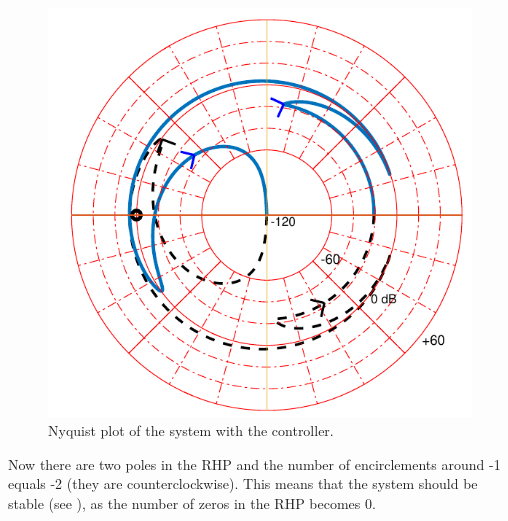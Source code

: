 \begin{figure}[H] 
	\centering 
	\includegraphics[scale=0.55]{figures/nyquistController}	
	\caption{Nyquist plot of the system with the controller.}
\end{figure}	\label{nyquistController}

Now there are two poles in the RHP and the number of encirclements around -1 equals -2 (they are counterclockwise). 
This means that the system should be stable (see ), as the number of zeros in the RHP becomes 0.
